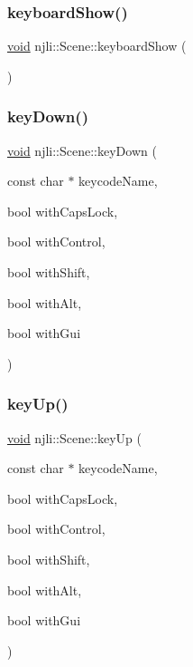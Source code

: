 \mbox{\label{classnjli_1_1_scene_a292f2f69409c9f30a2c16d20d40ffda6}} 
\subsubsection{\texorpdfstring{keyboard\+Show()}{keyboardShow()}}
{\footnotesize\ttfamily \mbox{\hyperlink{_thread_8h_af1e856da2e658414cb2456cb6f7ebc66}{void}} njli\+::\+Scene\+::keyboard\+Show (\begin{DoxyParamCaption}{ }\end{DoxyParamCaption})}

\mbox{\label{classnjli_1_1_scene_a4404a903bf1230b4933891bae10a9c86}} 
\subsubsection{\texorpdfstring{key\+Down()}{keyDown()}}
{\footnotesize\ttfamily \mbox{\hyperlink{_thread_8h_af1e856da2e658414cb2456cb6f7ebc66}{void}} njli\+::\+Scene\+::key\+Down (\begin{DoxyParamCaption}\item[{const char $\ast$}]{keycode\+Name,  }\item[{bool}]{with\+Caps\+Lock,  }\item[{bool}]{with\+Control,  }\item[{bool}]{with\+Shift,  }\item[{bool}]{with\+Alt,  }\item[{bool}]{with\+Gui }\end{DoxyParamCaption})}

\mbox{\label{classnjli_1_1_scene_a37ce7fc85fdb926bc66835ebd9f927b9}} 
\subsubsection{\texorpdfstring{key\+Up()}{keyUp()}}
{\footnotesize\ttfamily \mbox{\hyperlink{_thread_8h_af1e856da2e658414cb2456cb6f7ebc66}{void}} njli\+::\+Scene\+::key\+Up (\begin{DoxyParamCaption}\item[{const char $\ast$}]{keycode\+Name,  }\item[{bool}]{with\+Caps\+Lock,  }\item[{bool}]{with\+Control,  }\item[{bool}]{with\+Shift,  }\item[{bool}]{with\+Alt,  }\item[{bool}]{with\+Gui }\end{DoxyParamCaption})}

